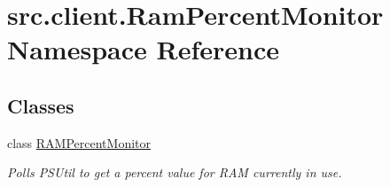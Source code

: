 \hypertarget{namespacesrc_1_1client_1_1_ram_percent_monitor}{\section{src.\-client.\-Ram\-Percent\-Monitor Namespace Reference}
\label{namespacesrc_1_1client_1_1_ram_percent_monitor}
}
\subsection*{Classes}
\begin{DoxyCompactItemize}
\item 
class \hyperlink{classsrc_1_1client_1_1_ram_percent_monitor_1_1_r_a_m_percent_monitor}{R\-A\-M\-Percent\-Monitor}
\begin{DoxyCompactList}\small\item\em Polls P\-S\-Util to get a percent value for R\-A\-M currently in use. \end{DoxyCompactList}\end{DoxyCompactItemize}

